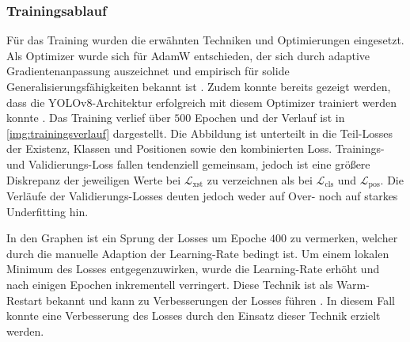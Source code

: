 
\subsubsection{Trainingsablauf}
\label{sec:trainingsverlauf}

Für das Training wurden die erwähnten Techniken und Optimierungen eingesetzt. Als Optimizer wurde sich für AdamW entschieden, der sich durch adaptive Gradientenanpassung auszeichnet und empirisch für solide Generalisierungsfähigkeiten bekannt ist \cite{adamw, adamw_good, adamw_good2, adamw_good3, adamw_good4}. Zudem konnte bereits gezeigt werden, dass die YOLOv8-Architektur erfolgreich mit diesem Optimizer trainiert werden konnte \cite{adamw_yolo}. Das Training verlief über $500$ Epochen und der Verlauf ist in \autoref{img:trainingsverlauf} dargestellt. Die Abbildung ist unterteilt in die Teil-Losses der Existenz, Klassen und Positionen sowie den kombinierten Loss. Trainings- und Validierungs-Loss fallen tendenziell gemeinsam, jedoch ist eine größere Diskrepanz der jeweiligen Werte bei $\mathcal{L}_\text{xst}$ zu verzeichnen als bei $\mathcal{L}_\text{cls}$ und $\mathcal{L}_\text{pos}$. Die Verläufe der Validierungs-Losses deuten jedoch weder auf Over- noch auf starkes Underfitting hin.

In den Graphen ist ein Sprung der Losses um Epoche $400$ zu vermerken, welcher durch die manuelle Adaption der Learning-Rate bedingt ist. Um einem lokalen Minimum des Losses entgegenzuwirken, wurde die Learning-Rate erhöht und nach einigen Epochen inkrementell verringert. Diese Technik ist als Warm-Restart bekannt und kann zu Verbesserungen der Losses führen \cite{lr_warm_restart}. In diesem Fall konnte eine Verbesserung des Losses durch den Einsatz dieser Technik erzielt werden.

